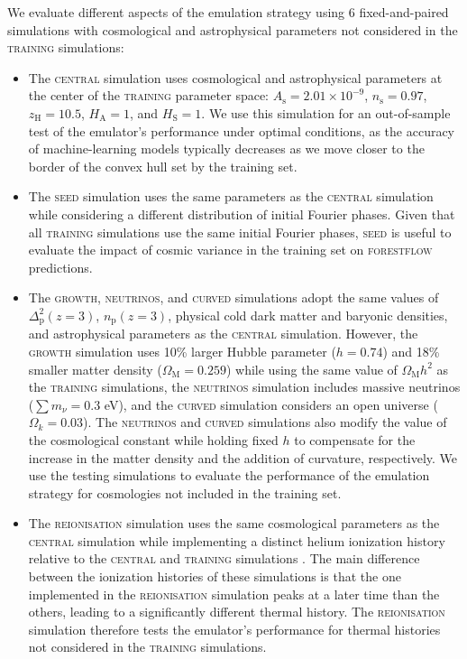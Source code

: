 \documentclass[longauth]{aa}
\newcommand{\forestflow}{\textsc{forestflow}\xspace}
\newcommand{\lacehc}{\textsc{training}\xspace}
\newcommand{\simseed}{\textsc{seed}\xspace}
\newcommand{\simigm}{\textsc{reionisation}\xspace}
\newcommand{\simcurved}{\textsc{curved}\xspace}
\newcommand{\simh}{\textsc{growth}\xspace}
\newcommand{\simnu}{\textsc{neutrinos}\xspace}
\newcommand{\simcentral}{\textsc{central}\xspace}
\begin{document}
We evaluate different aspects of the emulation strategy using 6 fixed-and-paired simulations with cosmological and astrophysical parameters not considered in the \lacehc simulations:
%
\begin{itemize}
    \item The \simcentral simulation uses cosmological and astrophysical parameters at the center of the \lacehc parameter space: $A_\mathrm{s}=2.01\times10^{-9}$, $n_\mathrm{s}=0.97$, $z_\mathrm{H}=10.5$, $H_\mathrm{A}=1$, and $H_\mathrm{S}=1$. We use this simulation for an out-of-sample test of the emulator's performance under optimal conditions, as the accuracy of machine-learning models typically decreases as we move closer to the border of the convex hull set by the training set.
    
    \item The \simseed simulation uses the same parameters as the \simcentral simulation while considering a different distribution of initial Fourier phases. Given that all \lacehc simulations use the same initial Fourier phases, \simseed is useful to evaluate the impact of cosmic variance in the training set on \forestflow predictions.
    
    \item The \simh, \simnu, and \simcurved simulations adopt the same values of $\Delta^2_\mathrm{p}(z=3)$, $n_\mathrm{p}(z=3)$, physical cold dark matter and baryonic densities, and astrophysical parameters as the \simcentral simulation. However, the \simh simulation uses 10\% larger Hubble parameter ($h=0.74$) and 18\% smaller matter density ($\Omega_\mathrm{M}=0.259$) while using the same value of $\Omega_\mathrm{M} h^2$ as the \lacehc simulations, the \simnu simulation includes massive neutrinos ($\sum m_\nu=0.3$ eV), and the \simcurved simulation considers an open universe ($\Omega_k=0.03$). The \simnu and \simcurved simulations also modify the value of the cosmological constant while holding fixed $h$ to compensate for the increase in the matter density and the addition of curvature, respectively. We use the testing simulations to evaluate the performance of the emulation strategy for cosmologies not included in the training set.

    \item The \simigm simulation uses the same cosmological parameters as the \simcentral simulation while implementing a distinct helium ionization history relative to the \simcentral and \lacehc simulations \citep{puchwein2019ConsistentModellingMetagalactic}. The main difference between the ionization histories of these simulations is that the one implemented in the \simigm simulation peaks at a later time than the others, leading to a significantly different thermal history. The \simigm simulation therefore tests the emulator's performance for thermal histories not considered in the \lacehc simulations.
\end{itemize}
\end{document}
